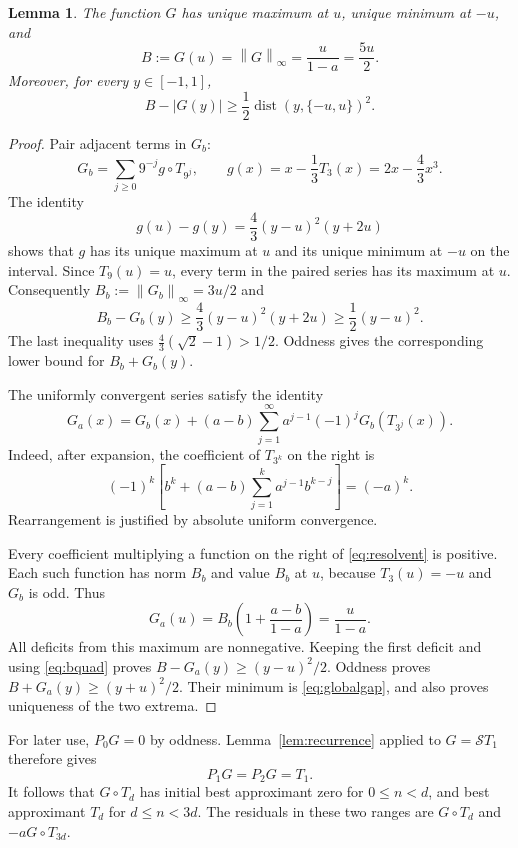 \documentclass[11pt]{article}
\newtheorem{lemma}[theorem]{Lemma}
\theoremstyle{remark}\newtheorem{remark}[theorem]{Remark}
\newcommand{\norm}[1]{\left\|#1\right\|_\infty}
\newcommand{\dist}{\operatorname{dist}}
\begin{document}
\begin{lemma}\label{lem:baseline}
The function $G$ has unique maximum at $u$, unique minimum at $-u$, and
\begin{equation}\label{eq:B}
 B:=G(u)=\norm G=\frac{u}{1-a}=\frac{5u}{2}.
\end{equation}
Moreover, for every $y\in[-1,1]$,
\begin{equation}\label{eq:globalgap}
 B-|G(y)|\ge\frac12\dist(y,\{-u,u\})^2.
\end{equation}
\end{lemma}
\begin{proof}
Pair adjacent terms in $G_b$:
\[
 G_b=\sum_{j\ge0}9^{-j}g\circ T_{9^j},
 \qquad g(x)=x-\frac13T_3(x)=2x-\frac43x^3.
\]
The identity
\[
 g(u)-g(y)=\frac43(y-u)^2(y+2u)
\]
shows that $g$ has its unique maximum at $u$ and its unique minimum at
$-u$ on the interval. Since $T_9(u)=u$, every term in the paired series
has its maximum at $u$. Consequently $B_b:=\norm{G_b}=3u/2$ and
\begin{equation}\label{eq:bquad}
 B_b-G_b(y)\ge\frac43(y-u)^2(y+2u)\ge\frac12(y-u)^2.
\end{equation}
The last inequality uses $\frac43(\sqrt2-1)>1/2$. Oddness gives the
corresponding lower bound for $B_b+G_b(y)$.

The uniformly convergent series satisfy the identity
\begin{equation}\label{eq:resolvent}
 G_a(x)=G_b(x)+(a-b)\sum_{j=1}^{\infty}
 a^{j-1}(-1)^jG_b(T_{3^j}(x)).
\end{equation}
Indeed, after expansion, the coefficient of $T_{3^k}$ on the right is
\[
 (-1)^k\left[b^k+(a-b)\sum_{j=1}^k a^{j-1}b^{k-j}\right]=(-a)^k.
\]
Rearrangement is justified by absolute uniform convergence.

Every coefficient multiplying a function on the right of
\eqref{eq:resolvent} is positive. Each such function has norm $B_b$ and
value $B_b$ at $u$, because $T_3(u)=-u$ and $G_b$ is odd. Thus
\[
 G_a(u)=B_b\left(1+\frac{a-b}{1-a}\right)=\frac{u}{1-a}.
\]
All deficits from this maximum are nonnegative. Keeping the first deficit
and using \eqref{eq:bquad} proves
$B-G_a(y)\ge(y-u)^2/2$. Oddness proves
$B+G_a(y)\ge(y+u)^2/2$. Their minimum is
\eqref{eq:globalgap}, and also proves uniqueness of the two extrema.
\end{proof}

For later use, $P_0G=0$ by oddness. Lemma~\ref{lem:recurrence} applied to
$G=\mathcal S T_1$ therefore gives
\begin{equation}\label{eq:Gsmall}
 P_1G=P_2G=T_1.
\end{equation}
It follows that $G\circ T_d$ has initial best approximant zero for
$0\le n<d$, and best approximant $T_d$ for $d\le n<3d$. The residuals
in these two ranges are $G\circ T_d$ and $-aG\circ T_{3d}$.
\end{document}
